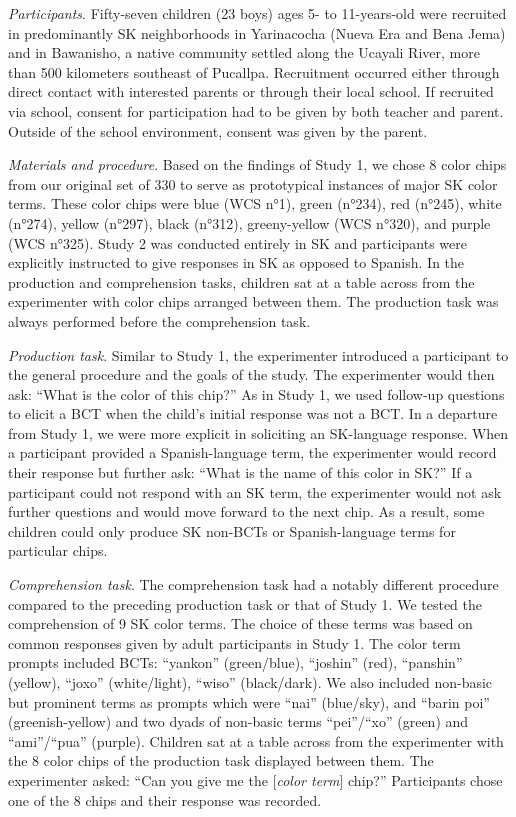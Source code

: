 \documentclass[
  english,
  ,man,floatsintext]{apa6}
\begin{document}
\emph{Participants}. Fifty-seven children (23 boys) ages 5- to 11-years-old were recruited in predominantly SK neighborhoods in Yarinacocha (Nueva Era and Bena Jema) and in Bawanisho, a native community settled along the Ucayali River, more than 500 kilometers southeast of Pucallpa. Recruitment occurred either through direct contact with interested parents or through their local school. If recruited via school, consent for participation had to be given by both teacher and parent. Outside of the school environment, consent was given by the parent.

\emph{Materials and procedure}. Based on the findings of Study 1, we chose 8 color chips from our original set of 330 to serve as prototypical instances of major SK color terms. These color chips were blue (WCS n°1), green (n°234), red (n°245), white (n°274), yellow (n°297), black (n°312), greeny-yellow (WCS n°320), and purple (WCS n°325). Study 2 was conducted entirely in SK and participants were explicitly instructed to give responses in SK as opposed to Spanish. In the production and comprehension tasks, children sat at a table across from the experimenter with color chips arranged between them. The production task was always performed before the comprehension task.

\emph{Production task}. Similar to Study 1, the experimenter introduced a participant to the general procedure and the goals of the study. The experimenter would then ask: \enquote{What is the color of this chip?} As in Study 1, we used follow-up questions to elicit a BCT when the child's initial response was not a BCT. In a departure from Study 1, we were more explicit in soliciting an SK-language response. When a participant provided a Spanish-language term, the experimenter would record their response but further ask: \enquote{What is the name of this color in SK?} If a participant could not respond with an SK term, the experimenter would not ask further questions and would move forward to the next chip. As a result, some children could only produce SK non-BCTs or Spanish-language terms for particular chips.

\emph{Comprehension task}. The comprehension task had a notably different procedure compared to the preceding production task or that of Study 1. We tested the comprehension of 9 SK color terms. The choice of these terms was based on common responses given by adult participants in Study 1. The color term prompts included BCTs: \enquote{yankon} (green/blue), \enquote{joshin} (red), \enquote{panshin} (yellow), \enquote{joxo} (white/light), \enquote{wiso} (black/dark). We also included non-basic but prominent terms as prompts which were \enquote{nai} (blue/sky), and \enquote{barin poi} (greenish-yellow) and two dyads of non-basic terms \enquote{pei}/\enquote{xo} (green) and \enquote{ami}/\enquote{pua} (purple). Children sat at a table across from the experimenter with the 8 color chips of the production task displayed between them. The experimenter asked: \enquote{Can you give me the {[}\emph{color term}{]} chip?} Participants chose one of the 8 chips and their response was recorded.
\end{document}
